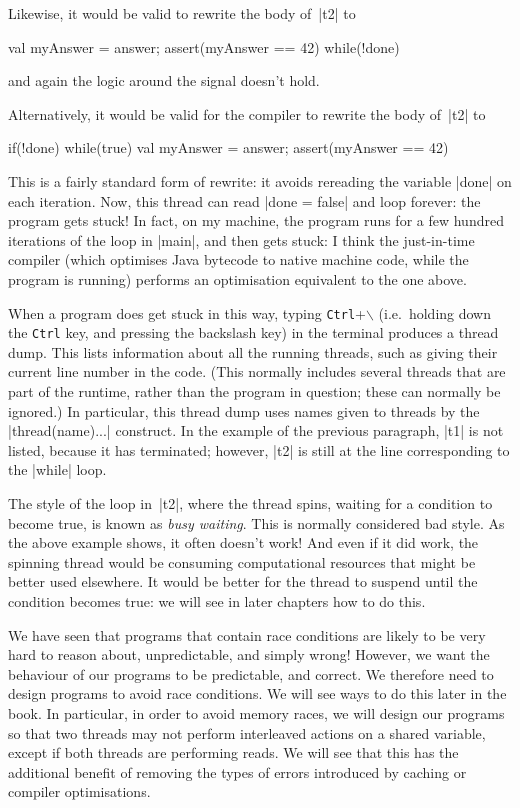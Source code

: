 Likewise, it would be valid to rewrite the body of~|t2| to
\begin{scala}
  val myAnswer = answer; assert(myAnswer == 42)
  while(!done){ } 
\end{scala}
and again the logic around the signal doesn't hold.  


Alternatively, it would be valid for the compiler to rewrite the body of~|t2|
to
% 
\begin{scala}
  if(!done){ while(true){ } }
  val myAnswer = answer; assert(myAnswer == 42)
\end{scala}
This is a fairly standard form of rewrite: it avoids rereading the variable
|done| on each iteration.  Now, this thread can read |done = false| and loop
forever: the program gets stuck!  In fact, on my machine, the program runs for
a few hundred iterations of the loop in |main|, and then gets stuck: I think
the just-in-time compiler (which optimises Java bytecode to native machine
code, while the program is running) performs an optimisation equivalent to the
one above.

When a program does get stuck in this way, typing \texttt{Ctrl}+$\backslash$
(i.e.~holding down the \texttt{Ctrl} key, and pressing the backslash key) in
the terminal produces a thread dump.  This lists
information about all the running threads, such as giving their current line
number in the code.  (This normally includes several threads that are part of
the runtime, rather than the program in question; these can normally be
ignored.)  In particular, this thread dump uses names given to threads by the
|thread(name){...}| construct.  In the example of the previous paragraph, |t1|
is not listed, because it has terminated; however, |t2| is still at the line
corresponding to the |while| loop.

The style of the loop in~|t2|, where the thread spins, waiting for a condition
to become true, is known as \emph{busy waiting}.  This is
normally considered bad style.  As the above example shows, it often doesn't
work!  And even if it did work, the spinning thread would be consuming
computational resources that might be better used elsewhere.  It would be
better for the thread to suspend until the condition becomes true: we will see
in later chapters how to do this.

We have seen that programs that contain race conditions are likely to be very
hard to reason about, unpredictable, and simply wrong!  However, we want the
behaviour of our programs to be predictable, and correct.  We therefore need
to design programs to avoid race conditions.  We will see ways to do this
later in the book.  In particular, in order to avoid memory races, we will
design our programs so that two threads may not perform interleaved actions on
a shared variable, except if both threads are performing reads.  We will see
that this has the additional benefit of removing the types of errors
introduced by caching or compiler optimisations.

